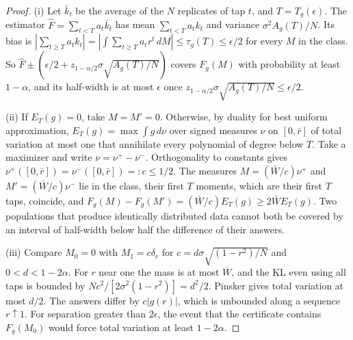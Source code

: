 \documentclass[12pt]{article}
\theoremstyle{definition}
\theoremstyle{remark}
\begin{document}
\begin{proof}
(i) Let $\bar k_t$ be the average of the $N$ replicates of tap $t$, and $T=T_g(\epsilon)$. The estimator $\hat F=\sum_{t<T}a_t\bar k_t$ has mean $\sum_{t<T}a_tk_t$ and variance $\sigma^2A_g(T)/N$. Its bias is $|\sum_{t\ge T}a_tk_t|=|\int\sum_{t\ge T}a_tr^t\,dM|\le\tau_g(T)\le\epsilon/2$ for every $M$ in the class. So $\hat F\pm(\epsilon/2+z_{1-\alpha/2}\sigma\sqrt{A_g(T)/N})$ covers $F_g(M)$ with probability at least $1-\alpha$, and its half-width is at most $\epsilon$ once $z_{1-\alpha/2}\sigma\sqrt{A_g(T)/N}\le\epsilon/2$.

(ii) If $E_T(g)=0$, take $M=M'=0$. Otherwise, by duality for best uniform approximation, $E_T(g)=\max\int g\,d\nu$ over signed measures $\nu$ on $[0,\bar r]$ of total variation at most one that annihilate every polynomial of degree below $T$. Take a maximizer and write $\nu=\nu^+-\nu^-$. Orthogonality to constants gives $\nu^+([0,\bar r])=\nu^-([0,\bar r])=:c\le1/2$. The measures $M=(\bar W/c)\nu^+$ and $M'=(\bar W/c)\nu^-$ lie in the class, their first $T$ moments, which are their first $T$ taps, coincide, and $F_g(M)-F_g(M')=(\bar W/c)E_T(g)\ge2\bar WE_T(g)$. Two populations that produce identically distributed data cannot both be covered by an interval of half-width below half the difference of their answers.

(iii) Compare $M_0=0$ with $M_1=c\delta_r$ for $c=d\sigma\sqrt{(1-r^2)/N}$ and $0<d<1-2\alpha$. For $r$ near one the mass is at most $\bar W$, and the KL even using all taps is bounded by $Nc^2/[2\sigma^2(1-r^2)]=d^2/2$. Pinsker gives total variation at most $d/2$. The answers differ by $c|g(r)|$, which is unbounded along a sequence $r\uparrow1$. For separation greater than $2\epsilon$, the event that the certificate contains $F_g(M_0)$ would force total variation at least $1-2\alpha$.


\end{proof}
\end{document}
